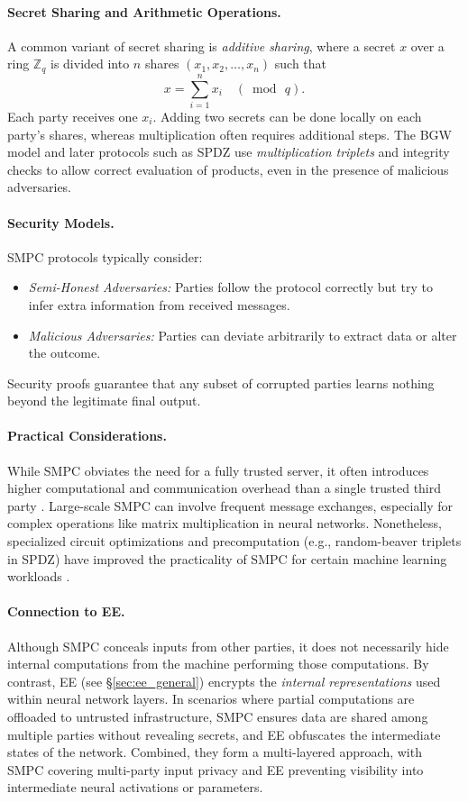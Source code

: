 \documentclass[10pt]{article}
\begin{document}
\paragraph{Secret Sharing and Arithmetic Operations.}
A common variant of secret sharing is \emph{additive sharing}, where a secret $x$ over a ring $\mathbb{Z}_q$ is divided into $n$ shares $(x_1, x_2, \dots, x_n)$ such that
\[
x = \sum_{i=1}^{n} x_i \quad (\bmod\, q).
\]
Each party receives one $x_i$. Adding two secrets can be done locally on each party’s shares, whereas multiplication often requires additional steps. The BGW model and later protocols such as SPDZ \cite{Damgaard2012} use \emph{multiplication triplets} and integrity checks to allow correct evaluation of products, even in the presence of malicious adversaries.

\paragraph{Security Models.}
SMPC protocols typically consider:
\begin{itemize}
    \item \emph{Semi-Honest Adversaries:} Parties follow the protocol correctly but try to infer extra information from received messages.
    \item \emph{Malicious Adversaries:} Parties can deviate arbitrarily to extract data or alter the outcome.
\end{itemize}
Security proofs guarantee that any subset of corrupted parties learns nothing beyond the legitimate final output.

\paragraph{Practical Considerations.}
While SMPC obviates the need for a fully trusted server, it often introduces higher computational and communication overhead than a single trusted third party \cite{Cramer2015}. Large-scale SMPC can involve frequent message exchanges, especially for complex operations like matrix multiplication in neural networks. Nonetheless, specialized circuit optimizations and precomputation (e.g., random-beaver triplets in SPDZ) have improved the practicality of SMPC for certain machine learning workloads \cite{Mohassel2017}.

\paragraph{Connection to EE.}
Although SMPC conceals inputs from other parties, it does not necessarily hide internal computations from the machine performing those computations. 
By contrast, EE (see \S\ref{sec:ee_general}) encrypts the \emph{internal representations} used within neural network layers. 
In scenarios where partial computations are offloaded to untrusted infrastructure, SMPC ensures data are shared among multiple parties without revealing secrets, and EE obfuscates the intermediate states of the network. Combined, they form a multi-layered approach, with SMPC covering multi-party input privacy and EE preventing visibility into intermediate neural activations or parameters.
\end{document}
